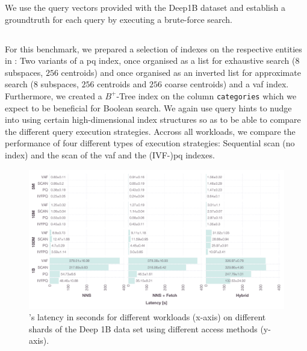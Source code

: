 We use the query vectors provided with the Deep1B dataset and establish a groundtruth for each query by executing a brute-force search.

\subsection{\cottontail}
\label{section:evaluation_bignns_cottontail}
For this benchmark, we prepared a selection of indexes on the respective entities in \cottontail{}: Two variants of a \acrshort{pq} index, once organised as a list for exhaustive search ($8$ subspaces, $256$ centroids) and once organised as an inverted list for approximate search ($8$ subspaces, $256$ centroids and $256$ coarse centroids) and a \acrshort{vaf} index. Furthermore, we created a $B^{+}$-Tree index on the column \texttt{categories} which we expect to be beneficial for Boolean search. We again use query hints to nudge \cottontail{} into using certain high-dimensional index structures so as to be able to compare the different query execution strategies. Accross all workloads, we compare the performance of four different types of execution strategies: Sequential scan (no index) and the scan of the \acrshort{vaf} and the (IVF-)\acrshort{pq} indexes.

\begin{landscape}
    \begin{figure}[p]
        \centering
        \includegraphics[width=1.55\textwidth]{figures/bignns/cottontail/bignns-cottontail-runtime}
        \caption {\cottontail{}'s latency in seconds for different workloads (x-axis) on different shards of the Deep 1B data set using different access methods (y-axis).}
        \label{figure:cottontail_runtime}
    \end{figure}
\end{landscape}

